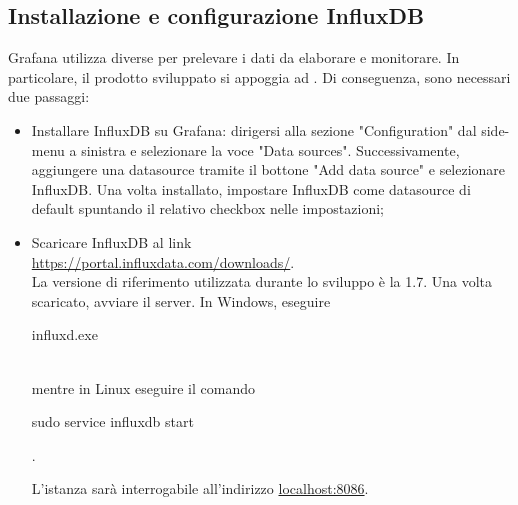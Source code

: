 \subsection{Installazione e configurazione InfluxDB}
Grafana utilizza diverse  per prelevare i dati da elaborare e monitorare. In particolare, il prodotto sviluppato si appoggia ad .
Di conseguenza, sono necessari due passaggi:
\begin{itemize}
	\item{Installare InfluxDB su Grafana:  dirigersi alla sezione "Configuration" dal side-menu a sinistra e selezionare la voce "Data sources". Successivamente, aggiungere una datasource tramite il bottone "Add data source" e selezionare InfluxDB. Una volta installato, impostare InfluxDB come datasource di default spuntando il relativo checkbox nelle impostazioni;}
	\item{Scaricare InfluxDB al link \\[0.2cm]
		\hspace*{10mm}\url{https://portal.influxdata.com/downloads/}.\\[0.2cm] La versione di riferimento utilizzata durante lo sviluppo è la 1.7. Una volta scaricato, avviare il server. In Windows, eseguire \\[0.2cm]
		\hspace*{10mm}\begin{ttfamily}influxd.exe\end{ttfamily}\\[0.2cm] mentre in Linux eseguire il comando \begin{ttfamily}sudo service influxdb start\end{ttfamily}.\\}
	L'istanza sarà interrogabile all'indirizzo \url{localhost:8086}.
\end{itemize}

\pagebreak